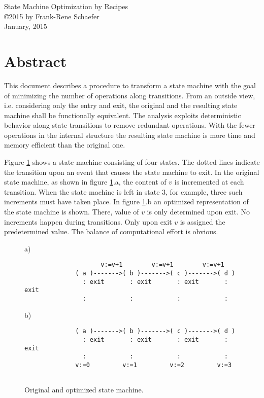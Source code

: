 \documentclass[12pt,a4paper]{scrartcl}
\begin{document}
\begin{center}
{\large State Machine Optimization by Recipes} \\ 
\copyright 2015 by Frank-Rene Schaefer         \\
January, 2015
\end{center}


%
\section{Abstract}

This document describes a procedure to transform a state machine with the goal
of minimizing the number of operations along transitions.  From an outside
view, i.e. considering only the entry and exit, the original and the resulting
state machine shall be functionally equivalent.  The analysis exploits
deterministic behavior along state transitions to remove redundant operations.
With the fewer operations in the internal structure the resulting state machine
is more time and memory efficient than the original one.  

Figure \ref{fig:two-state-machines} shows a state machine consisting of four
states.  The dotted lines indicate the transition upon an event that causes the
state machine to exit.  In the original state machine, as shown in figure
\ref{fig:two-state-machines}.a, the content of $v$ is incremented at each
transition. When the state machine is left in state 3, for example, three such
increments must have taken place. In figure \ref{fig:two-state-machines}.b an
optimized representation of the state machine is shown.  There, value of $v$ is
only determined upon exit.  No increments happen during transitions. Only upon
exit $v$ is assigned the predetermined value. The balance of computational
effort is obvious.

\begin{figure}[htbp] \leavevmode \label{fig:two-state-machines}
a)
\begin{verbatim}
                     v:=v+1        v:=v+1        v:=v+1
              ( a )------->( b )------->( c )------->( d )
                : exit       : exit       : exit       : exit
                :            :            :            :
\end{verbatim}
    
b)
\begin{verbatim}
              ( a )------->( b )------->( c )------->( d )
                : exit       : exit       : exit       : exit
                :            :            :            :
              v:=0         v:=1         v:=2         v:=3
    
\end{verbatim}
\caption{Original and optimized state machine.}
\end{figure}
                 
\end{document}
